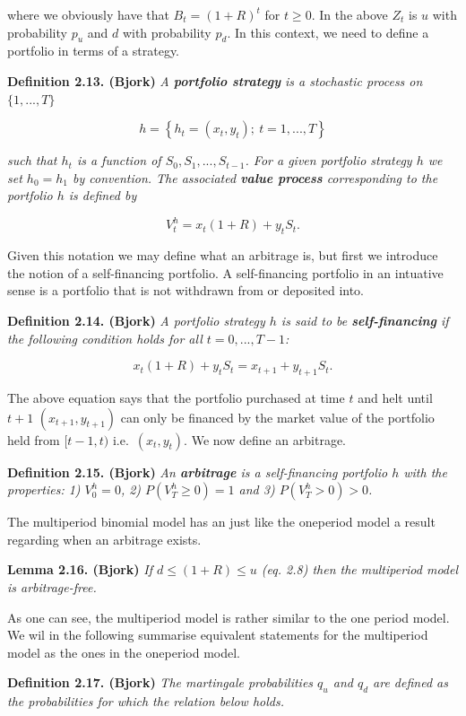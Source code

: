 \documentclass[
]{book}
\begin{document}
where we obviously have that \(B_t=(1+R)^t\) for \(t\ge 0\). In the above \(Z_t\) is \(u\) with probability \(p_u\) and \(d\) with probability \(p_d\). In this context, we need to define a portfolio in terms of a strategy.

\textbf{Definition 2.13. (Bjork)} \emph{A \textbf{portfolio strategy} is a stochastic process on \(\{1,...,T\}\)}

\[
h=\left\{h_t=(x_t,y_t);\ t=1,...,T\right\}
\]

\emph{such that \(h_t\) is a function of \(S_0,S_1,...,S_{t-1}\). For a given portfolio strategy \(h\) we set \(h_0=h_1\) by convention. The associated \textbf{value process} corresponding to the portfolio \(h\) is defined by}

\[
V_t^h=x_t(1+R)+y_tS_t.
\]

Given this notation we may define what an arbitrage is, but first we introduce the notion of a self-financing portfolio. A self-financing portfolio in an intuative sense is a portfolio that is not withdrawn from or deposited into.

\textbf{Definition 2.14. (Bjork)} \emph{A portfolio strategy \(h\) is said to be \textbf{self-financing} if the following condition holds for all \(t=0,...,T-1\):}

\[
x_t(1+R)+y_tS_t=x_{t+1}+y_{t+1}S_t.
\]

The above equation says that the portfolio purchased at time \(t\) and helt until \(t+1\) \((x_{t+1},y_{t+1})\) can only be financed by the market value of the portfolio held from \([t-1,t)\) i.e.~\((x_{t},y_{t})\). We now define an arbitrage.

\textbf{Definition 2.15. (Bjork)} \emph{An \textbf{arbitrage} is a self-financing portfolio \(h\) with the properties: 1) \(V^h_0=0\), 2) \(P(V^h_T\ge 0)=1\) and 3) \(P(V^h_T>0)>0\).}

The multiperiod binomial model has an just like the oneperiod model a result regarding when an arbitrage exists.

\textbf{Lemma 2.16. (Bjork)} \emph{If \(d\le (1+R)\le u\) (eq. 2.8) then the multiperiod model is arbitrage-free.}

As one can see, the multiperiod model is rather similar to the one period model. We wil in the following summarise equivalent statements for the multiperiod model as the ones in the oneperiod model.

\textbf{Definition 2.17. (Bjork)} \emph{The martingale probabilities \(q_u\) and \(q_d\) are defined as the probabilities for which the relation below holds.}
\end{document}
